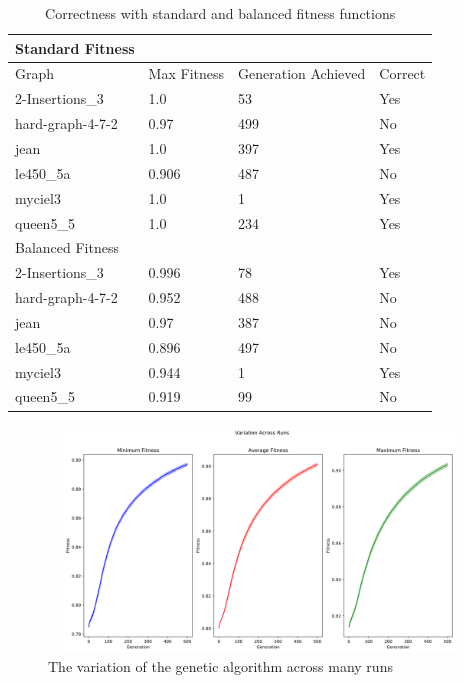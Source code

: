 \documentclass{article}
\begin{document}
	\begin{table}[]
	\centering
	\caption{Correctness with standard and balanced fitness functions}
	\label{correct}
	\begin{tabular}{llll}
	\hline
	Standard Fitness &             &                     &         \\ \hline
	Graph            & Max Fitness & Generation Achieved & Correct \\ \hline
	2-Insertions\_3  & 1.0         & 53                  & Yes     \\ \hline
	hard-graph-4-7-2 & 0.97        & 499                 & No      \\ \hline
	jean             & 1.0         & 397                 & Yes     \\ \hline
	le450\_5a        & 0.906       & 487                 & No      \\ \hline
	myciel3          & 1.0         & 1                   & Yes     \\ \hline
	queen5\_5        & 1.0         & 234                 & Yes     \\ \hline
	Balanced Fitness &             &                     &         \\ \hline
	2-Insertions\_3  & 0.996       & 78                  & Yes     \\ \hline
	hard-graph-4-7-2 & 0.952       & 488                 & No      \\ \hline
	jean             & 0.97        & 387                 & No      \\ \hline
	le450\_5a        & 0.896       & 497                 & No      \\ \hline
	myciel3          & 0.944       & 1                   & Yes     \\ \hline
	queen5\_5        & 0.919       & 99                  & No      \\ \hline
	\end{tabular}
	\end{table}

	\begin{figure}
		\centering
		\includegraphics[width=12cm,height=6cm]{standard.png}
		\caption{The variation of the genetic algorithm across many runs}
		\label{fig:standard}
	\end{figure}
\end{document}
